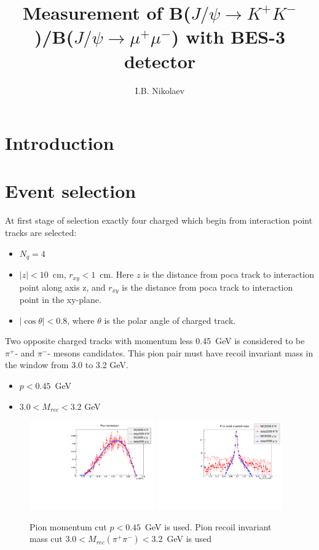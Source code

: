 \documentclass[a4paper,12pt]{article}
\title{Measurement of B($J/\psi \to K^+K^-$)/B($J/\psi \to \mu^+\mu^-$)
with BES-3 detector}
\author{I.B. Nikolaev}
\newcommand{\pipi}{\pi^{+}\pi^{-}}
\begin{document}
\maketitle

\section{Introduction}

\section{Event selection}

At first stage of selection exactly four  charged which begin from interaction point tracks are selected:
\begin{itemize}
	\item $N_q = 4$
	\item $|z| <  10$~cm,  $r_{xy} < 1$~cm. Here $z$ is the distance from poca track to interaction point along axis z, 
		and $r_{xy}$ is the distance from poca track to interaction point in the xy-plane.
	\item $|\cos{\theta}|<0.8$, where $\theta$ is the polar angle of charged track.
\end{itemize}


Two opposite charged tracks with momentum less 0.45~GeV is considered to be
$\pi^+$- and $\pi^-$- mesons candidates. This pion pair must have recoil
invariant mass in the window from 3.0 to 3.2 GeV.
\begin{itemize}
	\item $p<0.45$~GeV
	\item $3.0 < M_{rec} < 3.2$ GeV
\end{itemize}

\begin{figure}
\begin{center}
  \includegraphics[width=0.48\textwidth]{fig/pion_momentum.pdf} \hfill
  \includegraphics[width=0.48\textwidth]{fig/pion_Mrec.pdf}
  \caption{Pion momentum cut \mbox{$p<0.45$~GeV} is used. Pion recoil invariant mass cut $3.0 < M_{rec}(\pipi) < 3.2$~GeV is used}
\end{center}
\end{figure}
\end{document}
